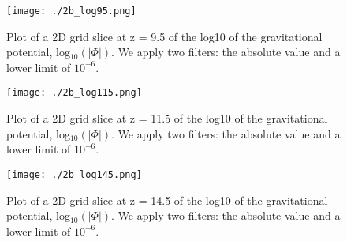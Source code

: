 \begin{figure}[h!]
  \centering
  \texttt{[image: ./2b\_log95.png]}
  \caption{Plot of a 2D grid slice at z = 9.5 of the log10 of the gravitational potential, log$_10(|\Phi|)$. We apply two filters: the absolute value and a lower limit of $10^{-6}$.}
\end{figure}

\begin{figure}[h!]
  \centering
  \texttt{[image: ./2b\_log115.png]}
  \caption{Plot of a 2D grid slice at z = 11.5 of the log10 of the gravitational potential, log$_10(|\Phi|)$. We apply two filters: the absolute value and a lower limit of $10^{-6}$.}
\end{figure}

\begin{figure}[h!]
  \centering
  \texttt{[image: ./2b\_log145.png]}
  \caption{Plot of a 2D grid slice at z = 14.5 of the log10 of the gravitational potential, log$_10(|\Phi|)$. We apply two filters: the absolute value and a lower limit of $10^{-6}$.}
\end{figure}












